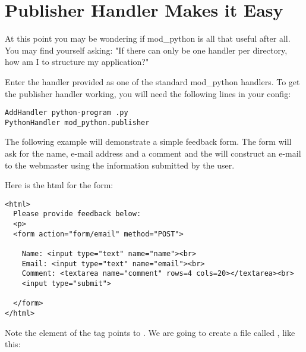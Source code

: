 \section{Publisher Handler Makes it Easy\label{tut-pub}}

At this point you may be wondering if mod_python is all that useful
after all. You may find yourself asking: "If there can only be one
handler per directory, how am I to structure my application?"

Enter the  handler provided as one of the standard
mod_python handlers. To get the publisher handler working,
you will need the following lines in your config:

\begin{verbatim}
AddHandler python-program .py
PythonHandler mod_python.publisher
\end{verbatim}

The following example will demonstrate a simple feedback form. The
form will ask for the name, e-mail address and a comment and the
will construct an e-mail to the webmaster using the information
submitted by the user.

Here is the html for the form:

\begin{verbatim}
<html>
  Please provide feedback below:
  <p>                           
  <form action="form/email" method="POST">

    Name: <input type="text" name="name"><br>
    Email: <input type="text" name="email"><br>
    Comment: <textarea name="comment" rows=4 cols=20></textarea><br>
    <input type="submit">

  </form>
</html>  
\end{verbatim}

Note the  element of the  tag points to
. We are going to create a file called ,
like this:

